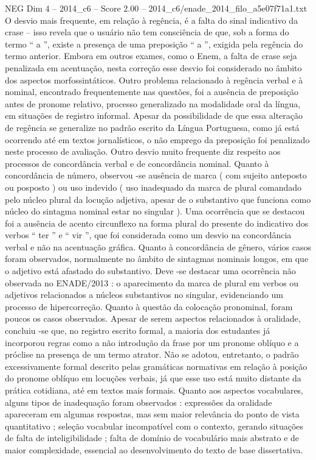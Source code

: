 \begin{textsample}{NEG Dim 4 – 2014\_c6 – Score 2.00 – 2014\_c6/enade\_2014\_filo\_a5e07f71a1.txt}
O desvio mais frequente, em relação à regência, é a falta do sinal indicativo da crase – isso revela que o usuário não tem consciência de que, sob a forma do termo “ a ”, existe a presença de uma preposição “ a ”, exigida pela regência do termo anterior.
Embora em outros exames, como o Enem, a falta de crase seja penalizada em acentuação, nesta correção esse desvio foi considerado no âmbito dos aspectos morfossintáticos.
Outro problema relacionado à regência verbal e à nominal, encontrado frequentemente nas questões, foi a ausência de preposição antes de pronome relativo, processo generalizado na modalidade oral da língua, em situações de registro informal.
Apesar da possibilidade de que essa alteração de regência se generalize no padrão escrito da Língua Portuguesa, como já está ocorrendo até em textos jornalísticos, o não emprego da preposição foi penalizado neste processo de avaliação.
Outro desvio muito frequente diz respeito aos processos de concordância verbal e de concordância nominal.
Quanto à concordância de número, observou -se ausência de marca ( com sujeito anteposto ou posposto ) ou uso indevido ( uso inadequado da marca de plural comandado pelo núcleo plural da locução adjetiva, apesar de o substantivo que funciona como núcleo do sintagma nominal estar no singular ).
Uma ocorrência que se destacou foi a ausência de acento circunflexo na forma plural do presente do indicativo dos verbos “ ter ” e “ vir ”, que foi considerada como um desvio na concordância verbal e não na acentuação gráfica.
Quanto à concordância de gênero, vários casos foram observados, normalmente no âmbito de sintagmas nominais longos, em que o adjetivo está afastado do substantivo.
Deve -se destacar uma ocorrência não observada no ENADE/2013 : o aparecimento da marca de plural em verbos ou adjetivos relacionados a núcleos substantivos no singular, evidenciando um processo de hipercorreção.
Quanto à questão da colocação pronominal, foram poucos os casos observados.
Apesar de serem aspectos relacionados à oralidade, concluiu -se que, no registro escrito formal, a maioria dos estudantes já incorporou regras como a não introdução da frase por um pronome oblíquo e a próclise na presença de um termo atrator.
Não se adotou, entretanto, o padrão excessivamente formal descrito pelas gramáticas normativas em relação à posição do pronome oblíquo em locuções verbais, já que esse uso está muito distante da prática cotidiana, até em textos mais formais.
Quanto aos aspectos vocabulares, alguns tipos de inadequação foram observados : expressões da oralidade apareceram em algumas respostas, mas sem maior relevância do ponto de vista quantitativo ; seleção vocabular incompatível com o contexto, gerando situações de falta de inteligibilidade ; falta de domínio de vocabulário mais abstrato e de maior complexidade, essencial ao desenvolvimento do texto de base dissertativa.

\end{textsample}
